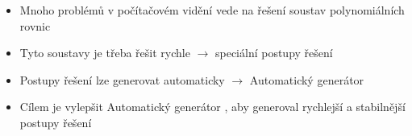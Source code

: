 \documentclass[cmpiitalkstyle, 25pt]{cmptalk}
\begin{document}
\begin{cmptalkslide}[Motivace]
  \begin{itemize}
    \item Mnoho problémů v počítačovém vidění vede na řešení soustav polynomiálních rovnic
    \item Tyto soustavy je třeba řešit rychle $\rightarrow$ speciální postupy řešení
    \item Postupy řešení lze generovat automaticky $\rightarrow$ Automatický generátor \cite{AutoGen}
    \item Cílem je vylepšit Automatický generátor \cite{AutoGen}, aby generoval rychlejší a stabilnější postupy řešení
  \end{itemize}


\end{cmptalkslide}
\end{document}
